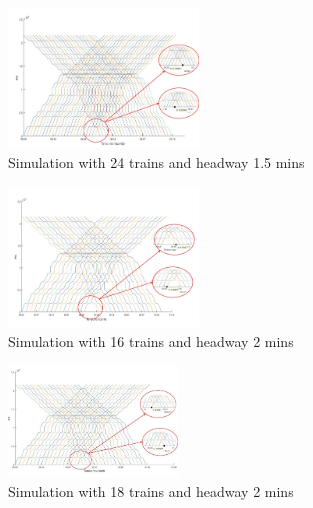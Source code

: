 \documentclass[conference]{IEEEtran}
\begin{document}
\begin{figure}[ht]
    \centering
    \includegraphics[width=0.45\textwidth,scale=1]{Imagenes_general/SIM-8_TIME-25_HW-1_5_TRAINS-24.jpg}
    \caption{Simulation with 24 trains and headway 1.5 mins}
    \label{fig:Simulation 8: 25 Trains / 1,5 mins headway}
\end{figure}


\begin{figure}[ht]
    \centering
    \includegraphics[width=0.45\textwidth,scale=1]{Imagenes_general/SIM-9_TIME-25_HW-2_TRAINS-16.jpg}
    \caption{Simulation with 16 trains and headway 2 mins}
    \label{fig:Simulation 9: 16 Trains / 2 mins headway}
\end{figure}

\begin{figure}[ht]
    \centering
    \includegraphics[width=0.4\textwidth,scale=1]{Imagenes_general/SIM-4_TIME-25_HW-2_TRAINS-18.jpg}
    \caption{Simulation with 18 trains and headway 2 mins}
    \label{fig:Simulation 4: 18 Trains / 2 mins headway}
\end{figure}

\end{document}

